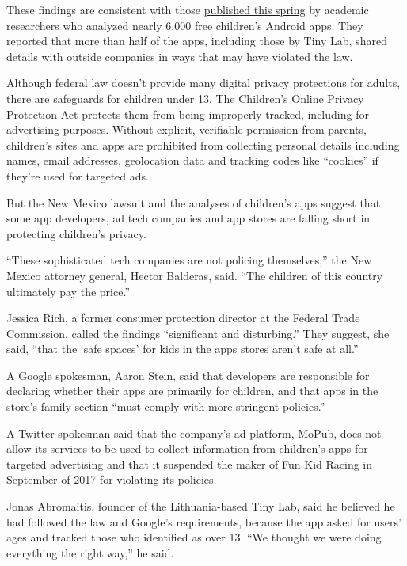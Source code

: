 These findings are consistent with those
\href{https://blues.cs.berkeley.edu/wp-content/uploads/2018/04/popets-2018-0021.pdf}{published
this spring} by academic researchers who analyzed nearly 6,000 free
children's Android apps. They reported that more than half of the apps,
including those by Tiny Lab, shared details with outside companies in
ways that may have violated the law.

Although federal law doesn't provide many digital privacy protections
for adults, there are safeguards for children under 13. The
\href{https://www.ftc.gov/tips-advice/business-center/privacy-and-security/children\%27s-privacy}{Children's
Online Privacy Protection Act} protects them from being improperly
tracked, including for advertising purposes. Without explicit,
verifiable permission from parents, children's sites and apps are
prohibited from collecting personal details including names, email
addresses, geolocation data and tracking codes like ``cookies'' if
they're used for targeted ads.

But the New Mexico lawsuit and the analyses of children's apps suggest
that some app developers, ad tech companies and app stores are falling
short in protecting children's privacy.

``These sophisticated tech companies are not policing themselves,'' the
New Mexico attorney general, Hector Balderas, said. ``The children of
this country ultimately pay the price.''

Jessica Rich, a former consumer protection director at the Federal Trade
Commission, called the findings ``significant and disturbing.'' They
suggest, she said, ``that the `safe spaces' for kids in the apps stores
aren't safe at all.''

A Google spokesman, Aaron Stein, said that developers are responsible
for declaring whether their apps are primarily for children, and that
apps in the store's family section ``must comply with more stringent
policies.''

A Twitter spokesman said that the company's ad platform, MoPub, does not
allow its services to be used to collect information from children's
apps for targeted advertising and that it suspended the maker of Fun Kid
Racing in September of 2017 for violating its policies.

Jonas Abromaitis, founder of the Lithuania-based Tiny Lab, said he
believed he had followed the law and Google's requirements, because the
app asked for users' ages and tracked those who identified as over 13.
``We thought we were doing everything the right way,'' he said.

